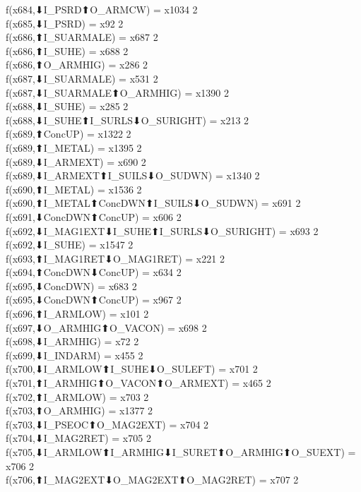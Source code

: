 f(x684,⬇I_PSRD⬆O_ARMCW) = x1034 {2} \\
f(x685,⬇I_PSRD) = x92 {2} \\
f(x686,⬆I_SUARMALE) = x687 {2} \\
f(x686,⬆I_SUHE) = x688 {2} \\
f(x686,⬆O_ARMHIG) = x286 {2} \\
f(x687,⬇I_SUARMALE) = x531 {2} \\
f(x687,⬇I_SUARMALE⬆O_ARMHIG) = x1390 {2} \\
f(x688,⬇I_SUHE) = x285 {2} \\
f(x688,⬇I_SUHE⬆I_SURLS⬇O_SURIGHT) = x213 {2} \\
f(x689,⬆ConcUP) = x1322 {2} \\
f(x689,⬆I_METAL) = x1395 {2} \\
f(x689,⬇I_ARMEXT) = x690 {2} \\
f(x689,⬇I_ARMEXT⬆I_SUILS⬇O_SUDWN) = x1340 {2} \\
f(x690,⬆I_METAL) = x1536 {2} \\
f(x690,⬆I_METAL⬆ConcDWN⬆I_SUILS⬇O_SUDWN) = x691 {2} \\
f(x691,⬇ConcDWN⬆ConcUP) = x606 {2} \\
f(x692,⬇I_MAG1EXT⬇I_SUHE⬆I_SURLS⬇O_SURIGHT) = x693 {2} \\
f(x692,⬇I_SUHE) = x1547 {2} \\
f(x693,⬆I_MAG1RET⬇O_MAG1RET) = x221 {2} \\
f(x694,⬆ConcDWN⬇ConcUP) = x634 {2} \\
f(x695,⬇ConcDWN) = x683 {2} \\
f(x695,⬇ConcDWN⬆ConcUP) = x967 {2} \\
f(x696,⬆I_ARMLOW) = x101 {2} \\
f(x697,⬇O_ARMHIG⬆O_VACON) = x698 {2} \\
f(x698,⬇I_ARMHIG) = x72 {2} \\
f(x699,⬇I_INDARM) = x455 {2} \\
f(x700,⬇I_ARMLOW⬆I_SUHE⬇O_SULEFT) = x701 {2} \\
f(x701,⬆I_ARMHIG⬆O_VACON⬆O_ARMEXT) = x465 {2} \\
f(x702,⬆I_ARMLOW) = x703 {2} \\
f(x703,⬆O_ARMHIG) = x1377 {2} \\
f(x703,⬇I_PSEOC⬆O_MAG2EXT) = x704 {2} \\
f(x704,⬇I_MAG2RET) = x705 {2} \\
f(x705,⬇I_ARMLOW⬆I_ARMHIG⬇I_SURET⬆O_ARMHIG⬆O_SUEXT) = x706 {2} \\
f(x706,⬆I_MAG2EXT⬇O_MAG2EXT⬆O_MAG2RET) = x707 {2} \\
